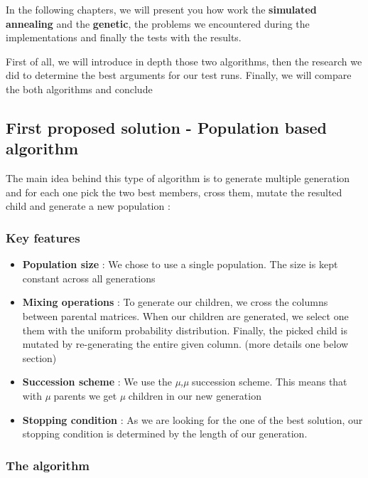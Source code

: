 \documentclass[11pt]{article}
\providecommand{\tightlist}{%
      \setlength{\itemsep}{0pt}\setlength{\parskip}{0pt}}
\begin{document}
In the following chapters, we will present you how work the
\textbf{simulated annealing} and the \textbf{genetic}, the problems we
encountered during the implementations and finally the tests with the
results.

First of all, we will introduce in depth those two algorithms, then the
research we did to determine the best arguments for our test runs.
Finally, we will compare the both algorithms and conclude

    \hypertarget{first-proposed-solution---population-based-algorithm}{%
\subsection{First proposed solution - Population based
algorithm}\label{first-propposed-solution---population-based-algorithm}}

The main idea behind this type of algorithm is to generate multiple
generation and for each one pick the two best members, cross them,
mutate the resulted child and generate a new population :

\hypertarget{key-features}{%
\subsubsection{Key features}\label{key-features}}

\begin{itemize}
\tightlist
\item
  \textbf{Population size} : We chose to use a single population. The
  size is kept constant across all generations
\item
  \textbf{Mixing operations} : To generate our children, we cross the
  columns between parental matrices. When our children are generated, we
  select one them with the uniform probability distribution.
  Finally, the picked child is mutated by re-generating the entire given
  column. (more details one below section)
\item
  \textbf{Succession scheme} : We use the \emph{µ,µ} succession scheme.
  This means that with \emph{µ} parents we get \emph{µ} children in our
  new generation
\item
  \textbf{Stopping condition} : As we are looking for the one of the
  best solution, our stopping condition is determined by the length of
  our generation.
\end{itemize}

\pagebreak

\hypertarget{the-algorithm}{%
\subsubsection{The algorithm}\label{the-algorithm}}
\end{document}
